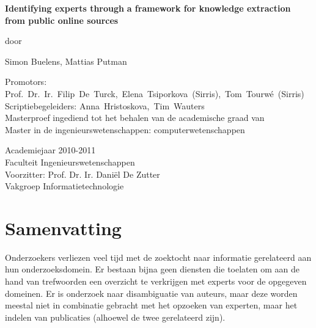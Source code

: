 
\newpage

{
\setlength{\baselineskip}{32pt}
\setlength{\parindent}{0pt}
\setlength{\parskip}{18pt}

\begin{center}

\noindent \textbf{\huge
Identifying experts through }
\textbf{\huge a framework for knowledge extraction}
\textbf{\huge from public online sources}

\setlength{\baselineskip}{12pt}
\setlength{\parindent}{0pt}
\setlength{\parskip}{12pt}

door 

Simon Buelens, Mattias Putman

Promotors: Prof.~Dr.~Ir.~Filip~De~Turck,~Elena~Tsiporkova~(Sirris),~Tom~Tourw\'{e}~(Sirris)\\
Scriptiebegeleiders: Anna~Hristoskova,~Tim~Wauters\\

Masterproef ingediend tot het behalen van de academische graad van\\
Master in de ingenieurswetenschappen: computerwetenschappen

Academiejaar 2010-2011\\
Faculteit Ingenieurswetenschappen\\
Voorzitter: Prof. Dr. Ir. Dani\"{e}l De Zutter\\
Vakgroep Informatietechnologie\\

\end{center}

\setlength{\baselineskip}{10pt}
\setlength{\parindent}{0pt}
\setlength{\parskip}{10pt}

\renewcommand{\baselinestretch}{1.1} 	%
\small\normalsize                       %

\section*{Samenvatting}

Onderzoekers verliezen veel tijd met de zoektocht naar informatie gerelateerd aan hun onderzoeksdomein. Er bestaan bijna geen diensten die toelaten om aan de hand van trefwoorden een overzicht te verkrijgen met experts voor de opgegeven domeinen. Er is onderzoek naar disambiguatie van auteurs, maar deze worden meestal niet in combinatie gebracht met het opzoeken van experten, maar het indelen van publicaties (alhoewel de twee gerelateerd zijn).

}
